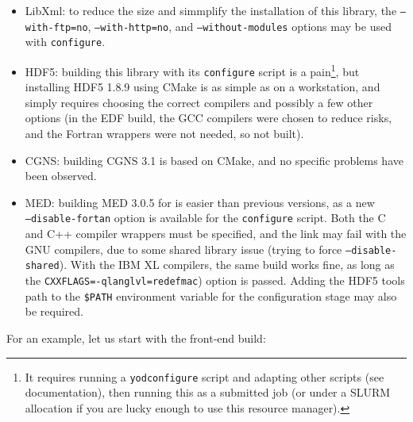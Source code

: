 \documentclass[a4paper,10pt,twoside]{csshortdoc}
\begin{document}
\begin{itemize}
\item LibXml: to reduce the size and simmplify the installation of this
library, the \texttt{--with-ftp=no}, \texttt{--with-http=no},
and \texttt{--without-modules} options may be used with \texttt{configure}.
\item HDF5: building this library with its \texttt{configure} script
is a pain\footnote{It requires running a \texttt{yodconfigure}
script and adapting other scripts (see documentation), then running
this as a submitted job (or under a SLURM allocation if you are lucky
enough to use this resource manager).}, but installing HDF5 1.8.9
using CMake is as simple as on a workstation, and simply requires
choosing the correct compilers and possibly a few other options (in
the EDF \CS build, the GCC compilers were chosen to reduce risks, and
the Fortran wrappers were not needed, so not built).
\item CGNS: building CGNS 3.1 is based on CMake, and no specific
problems have been observed.
\item MED: building MED 3.0.5 for \CS is easier than previous versions,
as a new \\ \texttt{--disable-fortan} option is available for the
\texttt{configure} script. Both the C and C++ compiler wrappers
must be specified, and the link may fail with the GNU compilers, due
to some shared library issue (trying to force \texttt{--disable-shared}).
With the IBM XL compilers, the same build works fine, as long as the
\texttt{CXXFLAGS=-qlanglvl=redefmac}) option is passed. Adding
the HDF5 tools path to the \texttt{\$PATH} environment variable for
the  configuration stage may also be required.
\end{itemize}

For an example, let us start with the front-end build:

\end{document}
